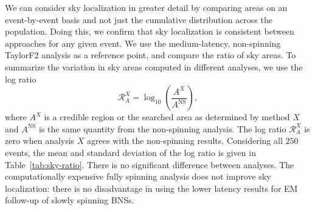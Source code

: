 We can consider sky localization in greater detail by comparing areas on an event-by-event basis and not just the cumulative distribution across the population. Doing this, we confirm that sky localization is consistent between approaches for any given event. We use the medium-latency, non-spinning TaylorF2 analysis as a reference point, and compare the ratio of sky areas. To summarize the variation in sky areas computed in different analyses, we use the log ratio
\begin{equation}
\mathcal{R}_A^X = \log_{10}\left(\frac{A^X}{A^\mathrm{NS}}\right),
\end{equation}
where $A^X$ is a credible region or the searched area as determined by method $X$ and $A^\mathrm{NS}$ is the same quantity from the non-spinning analysis. The log ratio $\mathcal{R}_A^X$ is zero when analysis $X$ agrees with the non-spinning results. Considering all $250$ events, the mean and standard deviation of the log ratio is given in Table~\ref{tab:sky-ratio}. There is no significant difference between analyses. The computationally expensive fully spinning analysis does not improve sky localization: there is no disadvantage in using the lower latency results for EM follow-up of slowly spinning BNSs.
  
  
  
  